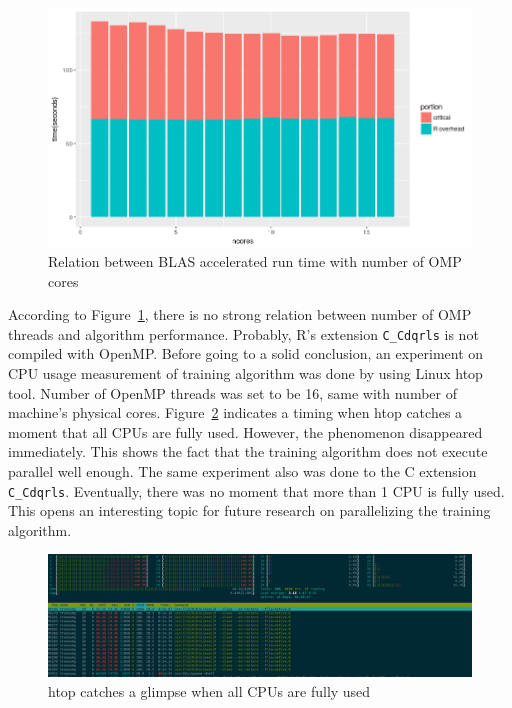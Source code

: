 \documentclass[English]{dicomopapers}
\begin{document}
\begin{figure}[ht]
  \vspace*{-2cm}
  \centering
  \includegraphics[width=\columnwidth,natwidth=857,natheight=484]{qr_blas_ret.png}
  \caption{Relation between BLAS accelerated run time with number of OMP cores}\label{fig:qr_blas_ret}
\end{figure}

 According to Figure~\ref{fig:qr_blas_ret}, there is no strong relation between number of OMP threads and algorithm performance. Probably, R's extension \texttt{C\_Cdqrls} is not compiled with OpenMP\@. Before going to a solid conclusion, an experiment on CPU usage measurement of training algorithm was done by using Linux htop tool. Number of OpenMP threads was set to be 16, same with number of machine's physical cores. Figure~\ref{fig:htop} indicates a timing when htop catches a moment that all CPUs are fully used. However, the phenomenon disappeared immediately. This shows the fact that the training algorithm does not execute parallel well enough. The same experiment also was done to the C extension \texttt{C\_Cdqrls}. Eventually, there was no moment that more than 1 CPU is fully used. This opens an interesting topic for future research on parallelizing the training algorithm.\newline

\begin{figure}[ht]
  \vspace*{-1cm}
  \centering
  \includegraphics[width=\columnwidth,natwidth=1902,natheight=550]{htop.png}
  \caption{htop catches a glimpse when all CPUs are fully used}\label{fig:htop}
\end{figure}
\end{document}
